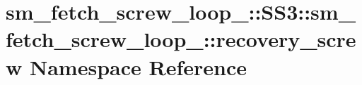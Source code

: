 \hypertarget{namespacesm__fetch__screw__loop__1_1_1SS3_1_1sm__fetch__screw__loop__1_1_1recovery__screw}{}\section{sm\+\_\+fetch\+\_\+screw\+\_\+loop\+\_\+:\+:S\+S3\+:\+:sm\+\_\+fetch\+\_\+screw\+\_\+loop\+\_\+:\+:recovery\+\_\+screw Namespace Reference}
\label{namespacesm__fetch__screw__loop__1_1_1SS3_1_1sm__fetch__screw__loop__1_1_1recovery__screw}
